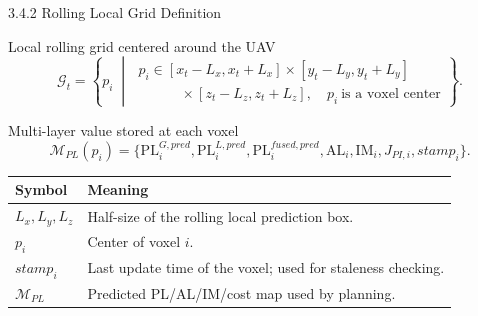 \documentclass[10pt,aspectratio=169,xcolor=dvipsnames]{beamer}
\newcommand{\PL}{\mathrm{PL}}
\newcommand{\AL}{\mathrm{AL}}
\newcommand{\IM}{\mathrm{IM}}
\newcommand{\Mmap}{\mathcal{M}}
\newcommand{\Ggrid}{\mathcal{G}}
\begin{document}
\begin{frame}{3.4.2 Rolling Local Grid Definition}
  \small
  \begin{block}{Local rolling grid centered around the UAV}
    \[
      \Ggrid_t=\left\{p_i\;\middle|\;
        \begin{array}{l}
          p_i\in [x_t-L_x,x_t+L_x]\times[y_t-L_y,y_t+L_y]\\
          \qquad\quad\times[z_t-L_z,z_t+L_z],\quad p_i\ \text{is a voxel center}
        \end{array}
      \right\}.
    \]
  \end{block}

  \begin{block}{Multi-layer value stored at each voxel}
    \[
      \Mmap_{PL}(p_i)=\{\PL^{G,pred}_i,\PL^{L,pred}_i,\PL^{fused,pred}_i,\AL_i,\IM_i,J_{PI,i},stamp_i\}.
    \]
  \end{block}

  \begin{table}\scriptsize
    \begin{tabular}{p{} p{}}
      \toprule
      \textbf{Symbol} & \textbf{Meaning}\\
      \midrule
      $L_x,L_y,L_z$ & Half-size of the rolling local prediction box.\\
      $p_i$ & Center of voxel $i$.\\
      $stamp_i$ & Last update time of the voxel; used for staleness checking.\\
      $\Mmap_{PL}$ & Predicted PL/AL/IM/cost map used by planning.\\
      \bottomrule
    \end{tabular}
  \end{table}
\end{frame}
\end{document}

